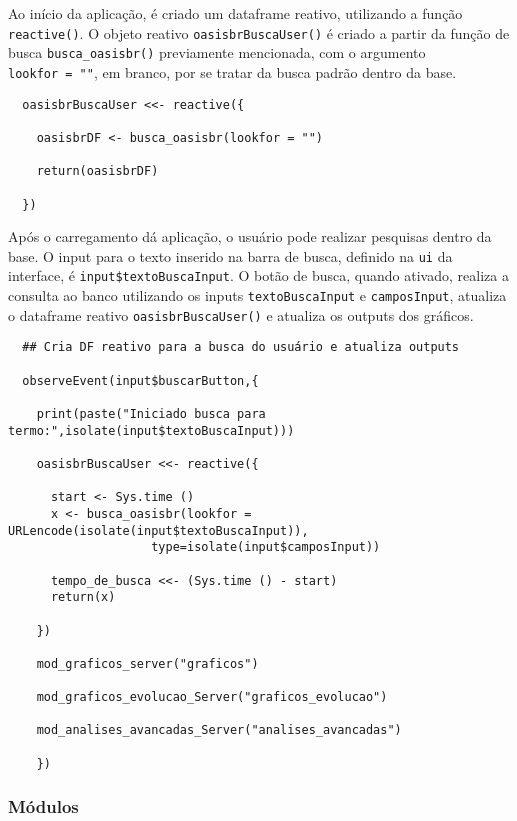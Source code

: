 \documentclass[
]{article}
\begin{document}
Ao início da aplicação, é criado um dataframe reativo, utilizando a
função \texttt{reactive()}. O objeto reativo \texttt{oasisbrBuscaUser()}
é criado a partir da função de busca \texttt{busca\_oasisbr()}
previamente mencionada, com o argumento \texttt{lookfor\ =\ ""}, em
branco, por se tratar da busca padrão dentro da base.

\begin{verbatim}
  oasisbrBuscaUser <<- reactive({

    oasisbrDF <- busca_oasisbr(lookfor = "")

    return(oasisbrDF)

  })
\end{verbatim}

Após o carregamento dá aplicação, o usuário pode realizar pesquisas
dentro da base. O input para o texto inserido na barra de busca,
definido na \texttt{ui} da interface, é \texttt{input\$textoBuscaInput}.
O botão de busca, quando ativado, realiza a consulta ao banco utilizando
os inputs \texttt{textoBuscaInput} e \texttt{camposInput}, atualiza o
dataframe reativo \texttt{oasisbrBuscaUser()} e atualiza os outputs dos
gráficos.

\begin{verbatim}
  ## Cria DF reativo para a busca do usuário e atualiza outputs
  
  observeEvent(input$buscarButton,{
    
    print(paste("Iniciado busca para termo:",isolate(input$textoBuscaInput)))
    
    oasisbrBuscaUser <<- reactive({
      
      start <- Sys.time ()
      x <- busca_oasisbr(lookfor = URLencode(isolate(input$textoBuscaInput)),
                    type=isolate(input$camposInput))
      
      tempo_de_busca <<- (Sys.time () - start)
      return(x)
      
    })
    
    mod_graficos_server("graficos")
    
    mod_graficos_evolucao_Server("graficos_evolucao")
    
    mod_analises_avancadas_Server("analises_avancadas")
    
    })
\end{verbatim}

\hypertarget{muxf3dulos}{%
\subsubsection{Módulos}\label{muxf3dulos}}
\end{document}
